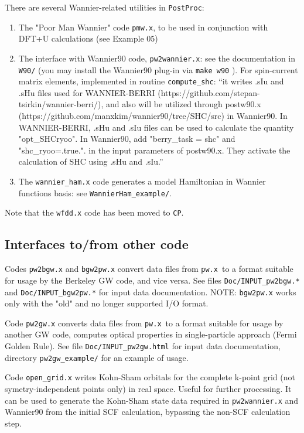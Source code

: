 \documentclass[12pt,a4paper]{article}
\def\pwx{\texttt{pw.x}}
\def\CP{\texttt{CP}}
\def\PostProc{\texttt{PostProc}}
\begin{document}
There are several Wannier-related utilities in \PostProc:
\begin{enumerate}
\item The "Poor Man Wannier" code \texttt{pmw.x}, to be used
in conjunction with DFT+U calculations (see Example 05)
\item The interface with Wannier90 code, \texttt{pw2wannier.x}:
see the documentation in \texttt{W90/} (you may install the 
Wannier90 plug-in via \texttt{make w90} ). For spin-current
matrix elements, implemented in routine \texttt{compute\_shc}:
``it writes .sIu and .sHu files used for
WANNIER-BERRI (https://github.com/stepan-tsirkin/wannier-berri/),
and also will be utilized through postw90.x
(https://github.com/manxkim/wannier90/tree/SHC/src) in Wannier90.
In WANNIER-BERRI, .sHu and .sIu files can be used to calculate the
quantity "opt\_SHCryoo". In Wannier90, add "berry\_task = shc" and
"shc\_ryoo=.true.". in the input parameters of postw90.x. They
activate the calculation of SHC using .sHu and .sIu.''
\item The \texttt{wannier\_ham.x} code generates a model Hamiltonian 
in Wannier functions basis: see \texttt{WannierHam\_example/}.
\end{enumerate}
Note that the \texttt{wfdd.x} code has been moved to \CP.

\subsection{Interfaces to/from other code}

Codes \texttt{pw2bgw.x} and \texttt{bgw2pw.x} convert data files from
\pwx\ to a format suitable for usage by the Berkeley GW code, and vice
versa. See files \texttt{Doc/INPUT\_pw2bgw.*} and \texttt{Doc/INPUT\_bgw2pw.*}
for input data documentation. NOTE: \texttt{bgw2pw.x} works only with the
"old" and no longer supported I/O format.

Code \texttt{pw2gw.x} converts data files from \pwx\ to a format suitable 
for usage by another GW code, computes optical properties in single-particle 
approach (Fermi Golden Rule). See file \texttt{Doc/INPUT\_pw2gw.html}
for input data documentation, directory \texttt{pw2gw\_example/}
for an example of usage.

Code \texttt{open\_grid.x} writes Kohn-Sham orbitals for the complete
k-point grid (not symetry-independent points only) in real space.
Useful for further processing. It can be used to generate the
Kohn-Sham state data required in \texttt{pw2wannier.x} and Wannier90
from the initial SCF calculation, bypassing the non-SCF calculation
step.
\end{document}

